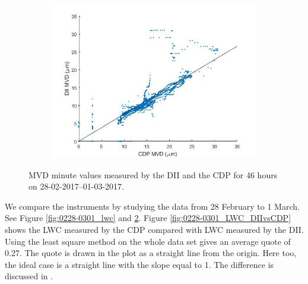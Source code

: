 \begin{figure}[ht]
\begin{subfigure}{.85\textwidth}
  \centering
  \includegraphics[width=1\linewidth]{figures/0228-0301/Mvdquote_DII-CDP_17022801-17030123_2760min_leastsquare0_7682}
  \label{fig:0228-0301_MVD_DIIvsCDP}
\end{subfigure}
\caption{MVD minute values measured by the DII and the CDP for 46 hours on 28-02-2017--01-03-2017.}
\label{fig:0228-0301_mvd}
\end{figure}

We compare the instruments by studying the data from 28 February to 1 March. See Figure \ref{fig:0228-0301_lwc} and \ref{fig:0228-0301_mvd}. Figure \ref{fig:0228-0301_LWC_DIIvsCDP} shows the LWC measured by the CDP compared with LWC measured by the DII. Using the least square method on the whole data set gives an average quote of 0.27. The quote is drawn in the plot as a straight line from the origin. Here too, the ideal case is a straight line with the slope equal to 1. The difference is discussed in .

